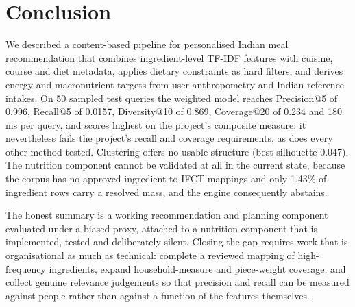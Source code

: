\documentclass[conference]{IEEEtran}
\begin{document}
\section{Conclusion}
\label{sec:conclusion}

We described a content-based pipeline for personalised Indian meal recommendation
that combines ingredient-level TF-IDF features with cuisine, course and diet
metadata, applies dietary constraints as hard filters, and derives energy and
macronutrient targets from user anthropometry and Indian reference intakes. On 50
sampled test queries the weighted model reaches Precision@5 of 0.996, Recall@5 of
0.0157, Diversity@10 of 0.869, Coverage@20 of 0.234 and 180\,ms per query, and
scores highest on the project's composite measure; it nevertheless fails the
project's recall and coverage requirements, as does every other method tested.
Clustering offers no usable structure (best silhouette 0.047). The nutrition
component cannot be validated at all in the current state, because the corpus has
no approved ingredient-to-IFCT mappings and only 1.43\% of ingredient rows carry a
resolved mass, and the engine consequently abstains.

The honest summary is a working recommendation and planning component evaluated
under a biased proxy, attached to a nutrition component that is implemented, tested
and deliberately silent. Closing the gap requires work that is organisational as
much as technical: complete a reviewed mapping of high-frequency ingredients,
expand household-measure and piece-weight coverage, and collect genuine relevance
judgements so that precision and recall can be measured against people rather than
against a function of the features themselves.

\balance


\end{document}
